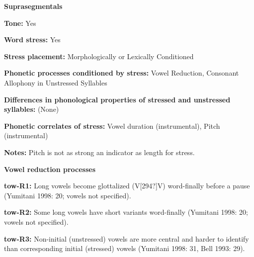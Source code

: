 \begin{styleBody}
\textbf{Suprasegmentals}
\end{styleBody}

\begin{styleBody}
\textbf{Tone:} Yes
\end{styleBody}

\begin{styleBody}
\textbf{Word stress:} Yes
\end{styleBody}

\begin{styleBody}
\textbf{Stress placement:} Morphologically or Lexically Conditioned
\end{styleBody}

\begin{styleBody}
\textbf{Phonetic processes conditioned by stress:} Vowel Reduction, Consonant Allophony in Unstressed Syllables
\end{styleBody}

\begin{styleBody}
\textbf{Differences in phonological properties of stressed and unstressed syllables:} (None)
\end{styleBody}

\begin{styleBody}
\textbf{Phonetic correlates of stress: }Vowel duration (instrumental), Pitch (instrumental)
\end{styleBody}

\begin{styleBody}
\textbf{Notes: }Pitch is not as strong an indicator as length for stress.
\end{styleBody}

\begin{styleBody}
\textbf{Vowel reduction processes}
\end{styleBody}

\begin{styleBody}
\textbf{tow-R1:} Long vowels become glottalized (V[294?]V) word-finally before a pause (Yumitani 1998: 20; vowels not specified).
\end{styleBody}

\begin{styleBody}
\textbf{tow-R2: }Some long vowels have short variants word-finally (Yumitani 1998: 20; vowels not specified).
\end{styleBody}

\begin{styleBody}
\textbf{tow-R3: }Non-initial (unstressed) vowels are more central and harder to identify than corresponding initial (stressed) vowels (Yumitani 1998: 31, Bell 1993: 29).
\end{styleBody}

